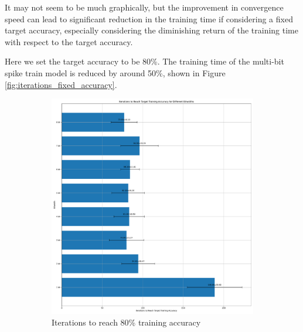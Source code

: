         It may not seem to be much graphically, but the improvement in convergence speed can lead to significant reduction in the training time if considering a fixed target accuracy, especially considering the diminishing return of the training time with respect to the target accuracy. 

        Here we set the target accuracy to be 80\%. The training time of the multi-bit spike train model is reduced by around 50\%, shown in Figure \ref{fig:iterations_fixed_accuracy}. 
        \begin{figure}[!htpb]
            \centering
            \begin{subfigure}[H]{0.47\textwidth}
                \centering
                \includegraphics[width=\textwidth]{../standard/FashionMNIST/plots/fashionmnist_train_iters.pdf}
                \caption{Iterations to reach 80\% training accuracy}
            \end{subfigure}
            \hfill
            \begin{subfigure}[H]{0.47\textwidth}
                \centering

\end{subfigure}
\end{figure}
